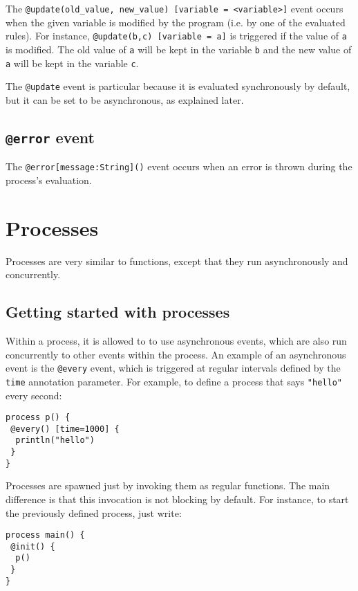 \documentclass[11pt]{report}
\begin{document}
The \texttt{@update(old\_value, new\_value) [variable = <variable>]} event occurs when the given variable is modified by the program (i.e. by one of the evaluated rules). For instance, \texttt{@update(b,c) [variable = a]} is triggered if the value of \texttt{a} is modified. The old value of \texttt{a} will be kept in the variable \texttt{b} and the new value of \texttt{a} will be kept in the variable \texttt{c}.

The \texttt{@update} event is particular because it is evaluated synchronously by default, but it can be set to be asynchronous, as explained later.

\subsection{\texttt{@error} event}

The \texttt{@error[message:String]()} event occurs when an error is thrown during the process's evaluation.

\section{Processes\label{sec:processes}}

Processes are very similar to functions, except that they run asynchronously and concurrently. 

\subsection{Getting started with processes}

Within a process, it is allowed to to use asynchronous events, which are also run concurrently to other events within the process. An example of an asynchronous event is the \texttt{@every} event, which is triggered at regular intervals defined by the \texttt{time} annotation parameter. For example, to define a process that says \texttt{"hello"} every second:

\begin{lstlisting}
process p() {
 @every() [time=1000] {
  println("hello")
 }
}
\end{lstlisting}

Processes are spawned just by invoking them as regular functions. The main difference is that this invocation is not blocking by default. For instance, to start the previously defined process, just write:

\begin{lstlisting}
process main() {
 @init() {
  p()
 }
}
\end{lstlisting}
\end{document}

